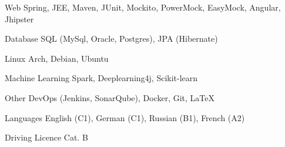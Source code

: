 
\begin{cvskills}

    \cvskill
    {Web}
    {Spring, JEE, Maven, JUnit, Mockito, PowerMock, EasyMock, Angular, Jhipster}

    \cvskill
    {Database}
    {SQL (MySql, Oracle, Postgres), JPA (Hibernate)}

    \cvskill
    {Linux}
    {Arch, Debian, Ubuntu}

    \cvskill
    {Machine Learning}
    {Spark, Deeplearning4j, Scikit-learn}

    \cvskill
    {Other}
    {DevOps (Jenkins, SonarQube), Docker, Git, LaTeX}

    \cvskill
    {Languages}
    {English (C1), German (C1), Russian (B1), French (A2)}

    \cvskill
    {Driving Licence}
    {Cat. B}

\end{cvskills}

